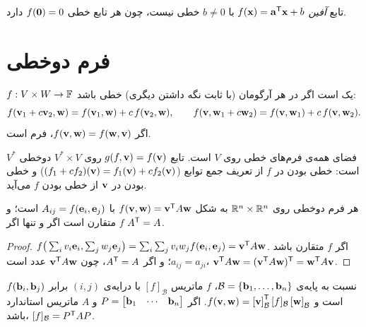 \begin{warning}
تابع \emph{آفین} $f(\mathbf{x})=\mathbf{a}^{\mathsf{T}}\mathbf{x}+b$ با $b\neq0$ خطی نیست، چون هر تابع خطی $f(\mathbf{0})=0$ دارد.
\end{warning}

\section{فرم دوخطی}

\begin{definition}
$f:V\times W\to\mathbb{F}$ یک  است اگر در هر آرگومان (با ثابت نگه داشتن دیگری) خطی باشد:
\[
f(\mathbf{v}_1+c\mathbf{v}_2,\mathbf{w})=f(\mathbf{v}_1,\mathbf{w})+c\,f(\mathbf{v}_2,\mathbf{w}),\qquad
f(\mathbf{v},\mathbf{w}_1+c\mathbf{w}_2)=f(\mathbf{v},\mathbf{w}_1)+c\,f(\mathbf{v},\mathbf{w}_2).
\]
اگر $f(\mathbf{v},\mathbf{w})=f(\mathbf{w},\mathbf{v})$، فرم  است.
\end{definition}

\begin{example}
 $V^*$ فضای همه‌ی فرم‌های خطی روی $V$ است. تابع $g(f,\mathbf{v})=f(\mathbf{v})$ روی $V^*\times V$ دوخطی است: خطی بودن در $f$ از تعریف جمع توابع ($(f_1+cf_2)(\mathbf{v})=f_1(\mathbf{v})+cf_2(\mathbf{v})$) و خطی بودن در $\mathbf{v}$ از خطی بودن $f$ می‌آید.
\end{example}

\begin{theorem}\label{thm:bilinear-matrix}
هر فرم دوخطی روی $\mathbb{R}^n\times\mathbb{R}^n$ به شکل $f(\mathbf{v},\mathbf{w})=\mathbf{v}^{\mathsf{T}} A\mathbf{w}$ با $A_{ij}=f(\mathbf{e}_i,\mathbf{e}_j)$ است؛ و $f$ متقارن است اگر و تنها اگر $A^{\mathsf{T}}=A$.
\end{theorem}
\begin{proof}
$f\big(\sum_iv_i\mathbf{e}_i,\sum_jw_j\mathbf{e}_j\big)=\sum_i\sum_jv_iw_jf(\mathbf{e}_i,\mathbf{e}_j)=\mathbf{v}^{\mathsf{T}} A\mathbf{w}$. اگر $f$ متقارن باشد $a_{ij}=a_{ji}$؛ و اگر $A^{\mathsf{T}}=A$، چون $\mathbf{v}^{\mathsf{T}} A\mathbf{w}$ عدد است، $\mathbf{v}^{\mathsf{T}} A\mathbf{w}=(\mathbf{v}^{\mathsf{T}} A\mathbf{w})^{\mathsf{T}}=\mathbf{w}^{\mathsf{T}} A\mathbf{v}$.
\end{proof}

\begin{definition}
نسبت به پایه‌ی  $\mathcal{B}=\{\mathbf{b}_1,\dots,\mathbf{b}_n\}$،  $f$ ماتریس $[f]_{\mathcal{B}}$ با درایه‌ی $(i,j)$ برابر $f(\mathbf{b}_i,\mathbf{b}_j)$ است و
$f(\mathbf{v},\mathbf{w})=\left[\mathbf{v}\right]_{\mathcal{B}}^{\mathsf{T}}[f]_{\mathcal{B}}\left[\mathbf{w}\right]_{\mathcal{B}}$.
اگر $P=\begin{bmatrix}\mathbf{b}_1&\cdots&\mathbf{b}_n\end{bmatrix}$ و $A$ ماتریس استاندارد باشد، $[f]_{\mathcal{B}}=P^{\mathsf{T}} AP$.
\end{definition}

